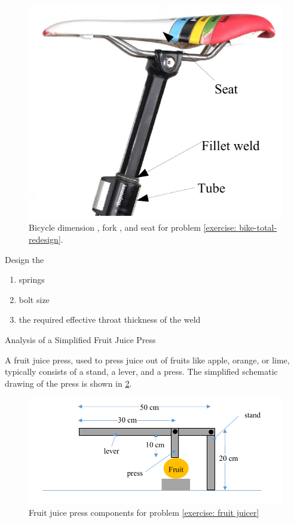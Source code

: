 \documentclass[
10pt,
a4paper,
openany,
svgnames,
]{book}
\newcommand{\exercise}{%
\item \label{lab:\arabic{chapter}.\arabic{exercisesi}}  %
}
\begin{document}
\begin{exercises}
\begin{figure}[h]
    \includegraphics[scale=0.7]{pictures/Machine-interaction/bicycle-seat}
    \caption{Bicycle dimension \cite{ai2bike}, fork \cite{zackbikefork}, and seat \cite{dresselseatpost} for problem \ref{exercise: bike-total-redesign}. }
    \label{fig: bike-example}
  \end{figure}
  
  Design the
  \begin{enumerate}
  \item springs
  \item bolt size
  \item the required effective throat thickness of the weld
  \end{enumerate}
  
  \exercise \label{exercise: fruit juicer} Analysis of a Simplified Fruit Juice Press
  
  A fruit juice press, used to press juice out of fruits like apple, orange, or lime, typically consists of a stand, a lever, and a press. The simplified schematic drawing of the press is shown in \cref{fig: fruit juicer}.
  
  \begin{figure}[h]
    \centering
    \includegraphics[scale=1]{pictures/Machine-interaction/fruit-juicer}
    \caption{Fruit juice press components for problem \ref{exercise: fruit juicer} }
    \label{fig: fruit juicer}
  \end{figure}
  

\end{exercises}
\end{document}
